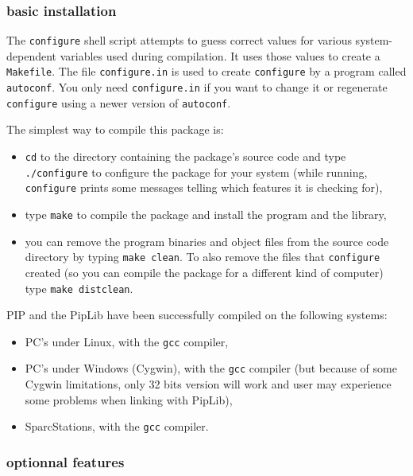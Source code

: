 \documentclass[12pt,a4paper]{article}
\begin{document}
\subsubsection{basic installation}

The {\tt configure} shell script attempts to guess correct values for
various system-dependent variables used during compilation.  It uses
those values to create a {\tt Makefile}.
The file {\tt configure.in} is used to create {\tt configure} by a program
called {\tt autoconf}.  You only need {\tt configure.in} if you want to change
it or regenerate {\tt configure} using a newer version of {\tt autoconf}.

The simplest way to compile this package is:
\begin{itemize}
\item {\tt cd} to the directory containing the package's source code and type \linebreak
      {\tt ./configure} to configure the package for your system
      (while running, {\tt configure} prints some
      messages telling which features it is checking for),

\item type {\tt make} to compile the package and install the program and the
      library,

\item you can remove the program binaries and object files from the
      source code directory by typing {\tt make clean}. To also remove the
      files that {\tt configure} created (so you can compile the package for
      a different kind of computer) type {\tt make distclean}.
\end{itemize}

PIP and the PipLib have been successfully compiled on the following systems:
\begin{itemize}
\item PC's under Linux, with the {\tt gcc} compiler,
\item PC's under Windows (Cygwin), with the {\tt gcc} compiler (but because
of some Cygwin limitations, only 32 bits version will work and user may
experience some problems when linking with PipLib),
\item SparcStations, with the {\tt gcc} compiler.
\end{itemize}

\subsubsection{optionnal features}   
\end{document}
